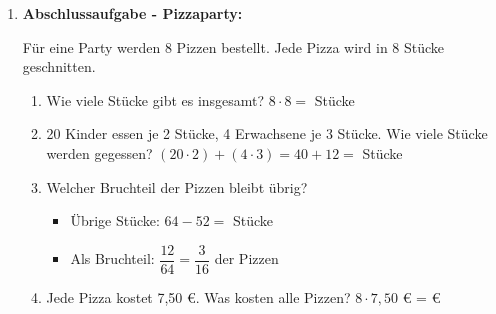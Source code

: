 \begin{enumerate}[resume, label=\arabic*.]
    \vspace{0.5cm}

    \item \textbf{Abschlussaufgabe - Pizzaparty:}

    Für eine Party werden 8 Pizzen bestellt. Jede Pizza wird in 8 Stücke geschnitten.

    \begin{enumerate}[label=\alph*)]
        \item Wie viele Stücke gibt es insgesamt? 
        $8 \cdot 8 = $ \underline{\hspace{3cm}} Stücke

        \item 20 Kinder essen je 2 Stücke, 4 Erwachsene je 3 Stücke.
        Wie viele Stücke werden gegessen?
        $(20 \cdot 2) + (4 \cdot 3) = 40 + 12 = $ \underline{\hspace{3cm}} Stücke

        \item Welcher Bruchteil der Pizzen bleibt übrig?
        \begin{itemize}
            \item Übrige Stücke: $64 - 52 = $ \underline{\hspace{2cm}} Stücke
            \item Als Bruchteil: $\dfrac{12}{64} = \dfrac{3}{16}$ der Pizzen
        \end{itemize}

        \item Jede Pizza kostet 7,50 €. Was kosten alle Pizzen?
        $8 \cdot 7,50$ € = \underline{\hspace{3cm}} €
    \end{enumerate}
\end{enumerate}